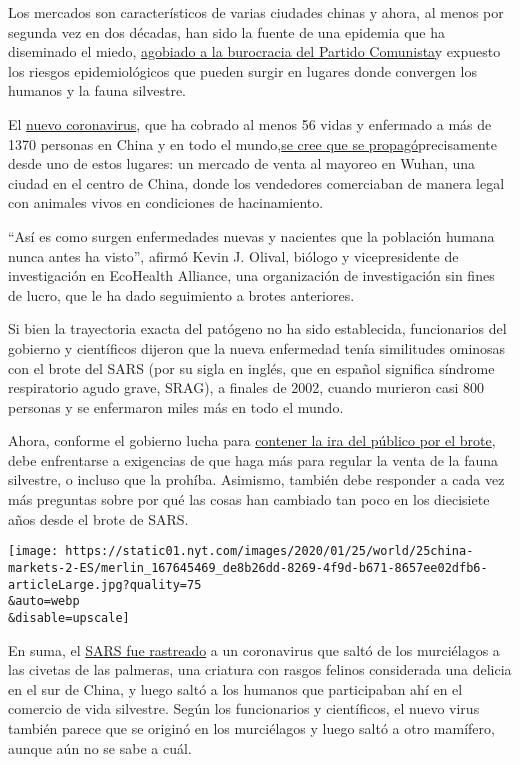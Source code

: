 Los mercados son característicos de varias ciudades chinas y ahora, al
menos por segunda vez en dos décadas, han sido la fuente de una epidemia
que ha diseminado el miedo,
\href{https://www.nytimes.com/2020/01/25/world/asia/coronavirus-crisis-china-response.html}{agobiado
a la burocracia del Partido Comunista}y expuesto los riesgos
epidemiológicos que pueden surgir en lugares donde convergen los humanos
y la fauna silvestre.

El
\href{https://www.nytimes.com/es/2020/01/21/espanol/ciencia-y-tecnologia/coronavirus-sintomas.html}{nuevo
coronavirus}, que ha cobrado al menos 56 vidas y enfermado a más de 1370
personas en China y en todo el
mundo,\href{https://www.nytimes.com/es/2020/01/21/espanol/ciencia-y-tecnologia/coronavirus-sintomas.html}{se
cree que se propagó}precisamente desde uno de estos lugares: un mercado
de venta al mayoreo en Wuhan, una ciudad en el centro de China, donde
los vendedores comerciaban de manera legal con animales vivos en
condiciones de hacinamiento.

``Así es como surgen enfermedades nuevas y nacientes que la población
humana nunca antes ha visto'', afirmó Kevin J. Olival, biólogo y
vicepresidente de investigación en EcoHealth Alliance, una organización
de investigación sin fines de lucro, que le ha dado seguimiento a brotes
anteriores.

Si bien la trayectoria exacta del patógeno no ha sido establecida,
funcionarios del gobierno y científicos dijeron que la nueva enfermedad
tenía similitudes ominosas con el brote del SARS (por su sigla en
inglés, que en español significa síndrome respiratorio agudo grave,
SRAG), a finales de 2002, cuando murieron casi 800 personas y se
enfermaron miles más en todo el mundo.

Ahora, conforme el gobierno lucha para
\href{https://www.nytimes.com/2020/01/23/world/asia/china-coronavirus-outbreak.html}{contener
la ira del público por el brote}, debe enfrentarse a exigencias de que
haga más para regular la venta de la fauna silvestre, o incluso que la
prohíba. Asimismo, también debe responder a cada vez más preguntas sobre
por qué las cosas han cambiado tan poco en los diecisiete años desde el
brote de SARS.

\texttt{[image: https://static01.nyt.com/images/2020/01/25/world/25china-markets-2-ES/merlin\_167645469\_de8b26dd-8269-4f9d-b671-8657ee02dfb6-articleLarge.jpg?quality=75\\\&auto=webp\\\&disable=upscale]}

En suma, el
\href{https://www.nytimes.com/2003/04/27/world/the-sars-epidemic-the-path-from-china-s-provinces-a-crafty-germ-breaks-out.html}{SARS
fue rastreado} a un coronavirus que saltó de los murciélagos a las
civetas de las palmeras, una criatura con rasgos felinos considerada una
delicia en el sur de China, y luego saltó a los humanos que participaban
ahí en el comercio de vida silvestre. Según los funcionarios y
científicos, el nuevo virus también parece que se originó en los
murciélagos y luego saltó a otro mamífero, aunque aún no se sabe a cuál.

